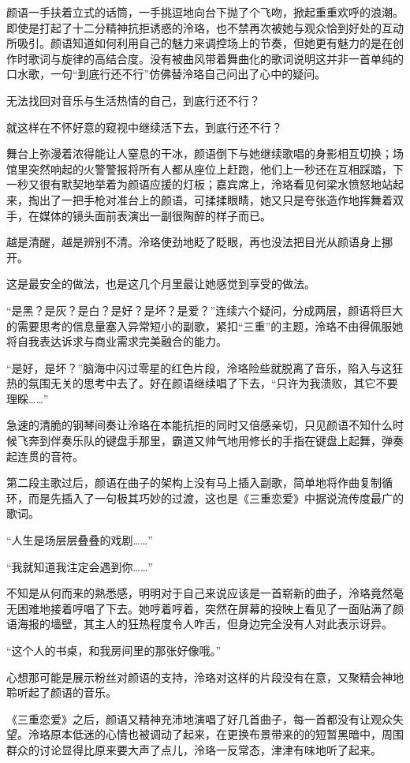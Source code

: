 \documentclass[UTF8, scheme = chinese, openany]{ctexbook}
\begin{document}
颜语一手扶着立式的话筒，一手挑逗地向台下抛了个飞吻，掀起重重欢呼的浪潮。即使是打起了十二分精神抗拒诱惑的泠珞，也不禁再次被她与观众恰到好处的互动所吸引。颜语知道如何利用自己的魅力来调控场上的节奏，但她更有魅力的是在创作时歌词与旋律的高结合度。没有被曲风带着舞曲化的歌词说明这并非一首单纯的口水歌，一句“到底行还不行”仿佛替泠珞自己问出了心中的疑问。

无法找回对音乐与生活热情的自己，到底行还不行？

就这样在不怀好意的窥视中继续活下去，到底行还不行？

舞台上弥漫着浓得能让人窒息的干冰，颜语倒下与她继续歌唱的身影相互切换；场馆里突然响起的火警警报将所有人都从座位上赶跑，他们上一秒还在互相踩踏，下一秒又很有默契地举着为颜语应援的灯板；嘉宾席上，泠珞看见何梁水愤怒地站起来，掏出了一把手枪对准台上的颜语，可揉揉眼睛，她又只是夸张造作地挥舞着双手，在媒体的镜头面前表演出一副很陶醉的样子而已。

越是清醒，越是辨别不清。泠珞使劲地眨了眨眼，再也没法把目光从颜语身上挪开。

这是最安全的做法，也是这几个月里最让她感觉到享受的做法。

“是黑？是灰？是白？是好？是坏？是爱？”连续六个疑问，分成两层，颜语将巨大的需要思考的信息量塞入异常短小的副歌，紧扣“三重”的主题，泠珞不由得佩服她将自我表达诉求与商业需求完美融合的能力。

“是好，是坏？”脑海中闪过零星的红色片段，泠珞险些就脱离了音乐，陷入与这狂热的氛围无关的思考中去了。好在颜语继续唱了下去，“只许为我溃败，其它不要理睬……”

急速的清脆的钢琴间奏让泠珞在本能抗拒的同时又倍感亲切，只见颜语不知什么时候飞奔到伴奏乐队的键盘手那里，霸道又帅气地用修长的手指在键盘上起舞，弹奏起连贯的音符。

第二段主歌过后，颜语在曲子的架构上没有马上插入副歌，简单地将作曲复制循环，而是先插入了一句极其巧妙的过渡，这也是《三重恋爱》中据说流传度最广的歌词。

“人生是场层层叠叠的戏剧……”

“我就知道我注定会遇到你……”

不知是从何而来的熟悉感，明明对于自己来说应该是一首崭新的曲子，泠珞竟然毫无困难地接着哼唱了下去。她哼着哼着，突然在屏幕的投映上看见了一面贴满了颜语海报的墙壁，其主人的狂热程度令人咋舌，但身边完全没有人对此表示讶异。

“这个人的书桌，和我房间里的那张好像哦。”

心想那可能是展示粉丝对颜语的支持，泠珞对这样的片段没有在意，又聚精会神地聆听起了颜语的音乐。

《三重恋爱》之后，颜语又精神充沛地演唱了好几首曲子，每一首都没有让观众失望。泠珞原本低迷的心情也被调动了起来，在更换布景带来的的短暂黑暗中，周围群众的讨论显得比原来要大声了点儿，泠珞一反常态，津津有味地听了起来。
\end{document}
